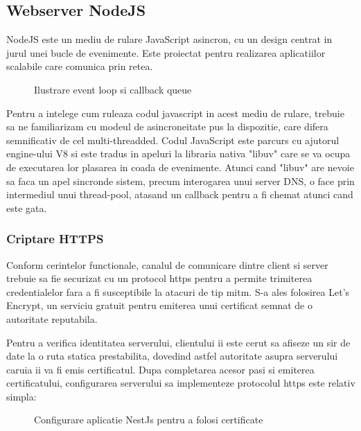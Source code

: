 \subsection {Webserver NodeJS}

NodeJS este un mediu de rulare JavaScript asincron, cu un design centrat in jurul unei bucle de evenimente. Este proiectat pentru realizarea aplicatiilor scalabile care comunica prin retea. \cite{NodeJs2021}

\begin{figure}[H]
  \centering
  \caption{Ilustrare event loop si callback queue \cite{DevelopPaper2019}}
\end{figure}

Pentru a intelege cum ruleaza codul javascript in acest mediu de rulare, trebuie sa ne familiarizam cu modeul de asincroneitate pus la dispozitie, care difera semnificativ de cel multi-threadded. Codul JavaScript este parcurs cu ajutorul engine-ului V8 si este tradus in apeluri la libraria nativa "libuv" care se va ocupa de executarea lor plasarea in coada de evenimente. Atunci cand "libuv" are nevoie sa faca un apel sincronde sistem, precum interogarea unui server DNS, o face prin intermediul unui thread-pool, atasand un callback pentru a fi chemat atunci cand este gata.

\subsubsection {Criptare HTTPS}

Conform cerintelor functionale, canalul de comunicare dintre client si server trebuie sa fie securizat cu un protocol \acrfull{https} pentru a permite trimiterea credentialelor fara a fi susceptibile la atacuri de tip \acrfull{mitm}. S-a ales folosirea Let's Encrypt, un serviciu gratuit pentru emiterea unui certificat semnat de o autoritate reputabila.

Pentru a verifica identitatea serverului, clientului ii este cerut sa afiseze un sir de date la o ruta statica prestabilita, dovedind astfel autoritate asupra serverului caruia ii va fi emis certificatul. Dupa completarea acesor pasi si emiterea certificatului, configurarea serverului sa implementeze protocolul \acrshort{https} este relativ simpla:

\begin{figure}[H]
  \centering
  \caption{Configurare aplicatie NestJs pentru a folosi certificate}
\end{figure}

